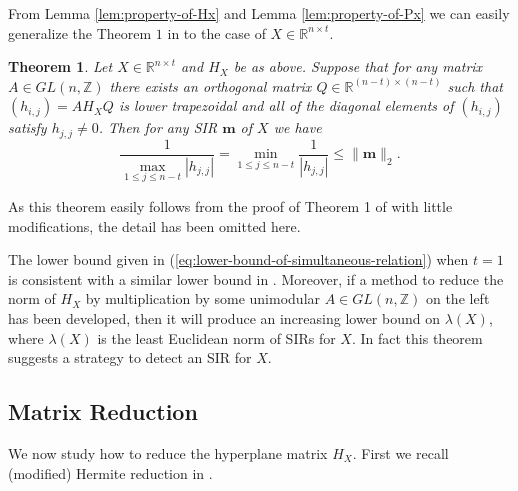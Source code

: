 \documentclass{sig-alternate}
\newtheorem{thm}[theorem]{Theorem}
\numberwithin{theorem}{section} \numberwithin{equation}{section}
\begin{document}
From Lemma \ref{lem:property-of-Hx} and Lemma
\ref{lem:property-of-Px} we can easily generalize the Theorem $1$ in
\cite{FBA1999} to the case of $X \in \mathbb{R}^{n\times t}$.

\begin{thm}\label{thm:lower-bound-of-simultaneous-relations}
Let $X \in \mathbb{R}^{n\times t}$ and $H_{X}$ be as above. Suppose
that for any matrix $A \in GL(n, \mathbb{Z})$ there exists an
orthogonal matrix $Q \in \mathbb{R}^{(n-t)\times(n-t)}$ such that
$(h_{i,j}) = AH_{X}Q$ is lower trapezoidal and all of the diagonal
elements of $(h_{i,j})$ satisfy $h_{j,j} \neq 0$. Then for any SIR
$\mathbf{m}$ of $X$ we have
\begin{equation}\label{eq:lower-bound-of-simultaneous-relation}
\frac{1}{\max_{1\leq j\leq n-t}|h_{j,j}|} = \min_{1\leq j\leq
n-t}\frac{1}{|h_{j,j}|} \leq \|\mathbf{m}\|_2.
\end{equation}
\end{thm}

As this theorem easily follows from the proof of Theorem 1 of \cite{FBA1999} with
little modifications, the detail has been  omitted here.

 The lower
bound given in (\ref{eq:lower-bound-of-simultaneous-relation}) when
$t=1$ is consistent with a similar lower bound in \cite{FF1979,
FF1982}. Moreover, if a method to reduce the norm of $H_X$ by
multiplication by some unimodular $A\in GL(n, \mathbb{Z})$ on the
left has been developed, then it will produce an increasing lower
bound on $\lambda(X)$, where $\lambda(X)$ is the least Euclidean
norm of SIRs for $X$. In fact this theorem suggests a strategy to
detect an SIR for $X$.



\subsection{Matrix Reduction}\label{subsec:Matrix-Reudce}
We now study how to reduce the hyperplane matrix $H_X$. First we recall (modified) Hermite reduction in \cite{FBA1999}.
\end{document}
